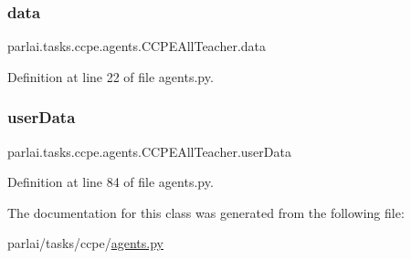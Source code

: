\subsubsection{\texorpdfstring{data}{data}}
{\footnotesize\ttfamily parlai.\+tasks.\+ccpe.\+agents.\+C\+C\+P\+E\+All\+Teacher.\+data}



Definition at line 22 of file agents.\+py.

\mbox{\label{classparlai_1_1tasks_1_1ccpe_1_1agents_1_1CCPEAllTeacher_ac05613e2339436bf69b6319a197a6ce5}} 
\subsubsection{\texorpdfstring{user\+Data}{userData}}
{\footnotesize\ttfamily parlai.\+tasks.\+ccpe.\+agents.\+C\+C\+P\+E\+All\+Teacher.\+user\+Data}



Definition at line 84 of file agents.\+py.



The documentation for this class was generated from the following file\+:\begin{DoxyCompactItemize}
\item 
parlai/tasks/ccpe/\hyperlink{parlai_2tasks_2ccpe_2agents_8py}{agents.\+py}\end{DoxyCompactItemize}
